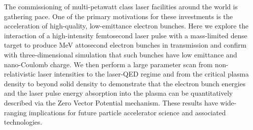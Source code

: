 
The commissioning of multi-petawatt class laser facilities around the world is gathering pace. One of the primary motivations for these investments is the acceleration of high-quality, low-emittance electron bunches. Here we explore the interaction of a high-intensity femtosecond laser pulse with a mass-limited dense target to produce MeV attosecond electron bunches in transmission and confirm with three-dimensional simulation that such bunches have low emittance and nano-Coulomb charge. We then perform a large parameter scan from non-relativistic laser intensities to the laser-QED regime and from the critical plasma density to beyond solid density to demonstrate that the electron bunch energies and the laser pulse energy absorption into the plasma can be quantitatively described via the Zero Vector Potential mechanism. These results have wide-ranging implications for future particle accelerator science and associated technologies.